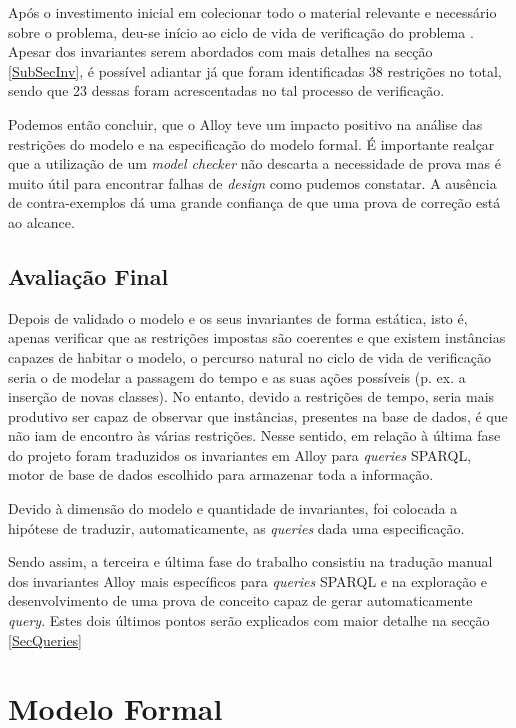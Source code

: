 \documentclass[tikz,runningheads,a4paper]{llncs}
\begin{document}
Após o investimento inicial em colecionar todo o material relevante e necessário sobre o problema, deu-se início ao ciclo de vida de verificação do problema \cite{jno}. Apesar dos invariantes serem abordados com mais detalhes na secção \ref{SubSecInv}, é possível adiantar já que foram identificadas 38 restrições no total, sendo que 23 dessas foram acrescentadas no tal processo de verificação.

Podemos então concluir, que o Alloy teve um impacto positivo na análise das restrições do modelo e na especificação do modelo formal. É importante realçar que a utilização de um \textit{model checker} não descarta a necessidade de prova mas é muito útil para encontrar falhas de \textit{design} como pudemos constatar. A ausência de contra-exemplos dá uma grande confiança de que uma prova de correção está ao alcance.

\subsection{Avaliação Final}

Depois de validado o modelo e os seus invariantes de forma estática, isto é,
apenas verificar que as restrições impostas são coerentes e que existem
instâncias capazes de habitar o modelo, o percurso natural no ciclo de vida de
verificação seria o de modelar a passagem do tempo e as suas ações possíveis
(p. ex. a inserção de novas classes). No entanto, devido a restrições de tempo,
seria mais produtivo ser capaz de observar que instâncias, presentes na base de
dados, é que não iam de encontro às várias restrições. Nesse sentido, em relação
à última fase do projeto foram traduzidos os invariantes em Alloy para
\textit{queries} SPARQL, motor de base de dados escolhido para armazenar toda a
informação.

Devido à dimensão do modelo e quantidade de invariantes, foi colocada a hipótese
de traduzir, automaticamente, as \textit{queries} dada uma especificação.

Sendo assim, a terceira e última fase do trabalho consistiu na tradução manual
dos invariantes Alloy mais específicos para \textit{queries} SPARQL e na
exploração e desenvolvimento de uma prova de conceito capaz de gerar
automaticamente  \textit{query}. Estes dois últimos pontos serão explicados com
maior detalhe na secção \ref{SecQueries}

\section{Modelo Formal} \label{SecModel}
\end{document}
